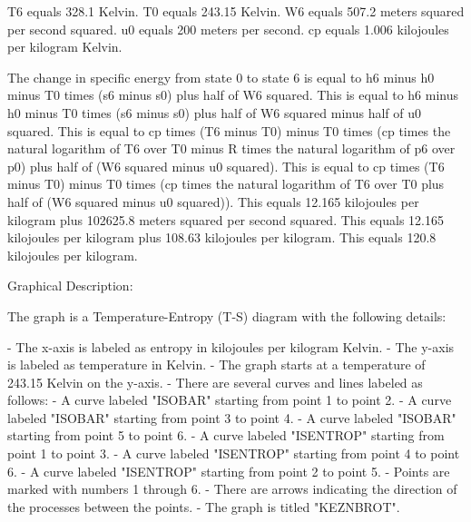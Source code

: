 T6 equals 328.1 Kelvin. T0 equals 243.15 Kelvin. W6 equals 507.2 meters squared per second squared. u0 equals 200 meters per second. cp equals 1.006 kilojoules per kilogram Kelvin.

The change in specific energy from state 0 to state 6 is equal to h6 minus h0 minus T0 times (s6 minus s0) plus half of W6 squared. This is equal to h6 minus h0 minus T0 times (s6 minus s0) plus half of W6 squared minus half of u0 squared. This is equal to cp times (T6 minus T0) minus T0 times (cp times the natural logarithm of T6 over T0 minus R times the natural logarithm of p6 over p0) plus half of (W6 squared minus u0 squared). This is equal to cp times (T6 minus T0) minus T0 times (cp times the natural logarithm of T6 over T0 plus half of (W6 squared minus u0 squared)). This equals 12.165 kilojoules per kilogram plus 102625.8 meters squared per second squared. This equals 12.165 kilojoules per kilogram plus 108.63 kilojoules per kilogram. This equals 120.8 kilojoules per kilogram.

Graphical Description:

The graph is a Temperature-Entropy (T-S) diagram with the following details:

- The x-axis is labeled as entropy in kilojoules per kilogram Kelvin.
- The y-axis is labeled as temperature in Kelvin.
- The graph starts at a temperature of 243.15 Kelvin on the y-axis.
- There are several curves and lines labeled as follows:
  - A curve labeled "ISOBAR" starting from point 1 to point 2.
  - A curve labeled "ISOBAR" starting from point 3 to point 4.
  - A curve labeled "ISOBAR" starting from point 5 to point 6.
  - A curve labeled "ISENTROP" starting from point 1 to point 3.
  - A curve labeled "ISENTROP" starting from point 4 to point 6.
  - A curve labeled "ISENTROP" starting from point 2 to point 5.
- Points are marked with numbers 1 through 6.
- There are arrows indicating the direction of the processes between the points.
- The graph is titled "KEZNBROT".